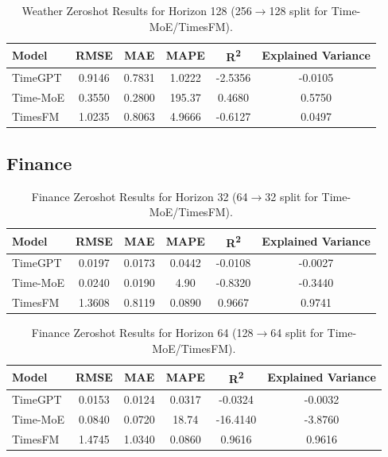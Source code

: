 \begin{table}[h!]
\centering
\begin{tabular}{lccccc}
\hline
Model      & RMSE   & MAE    & MAPE    & R\textsuperscript{2} & Explained Variance \\
\hline
TimeGPT    & 0.9146 & 0.7831 & 1.0222 & -2.5356 & -0.0105 \\
Time-MoE   & 0.3550 & 0.2800 & 195.37 & 0.4680  & 0.5750 \\
TimesFM    & 1.0235 & 0.8063 & 4.9666 & -0.6127 & 0.0497 \\
\hline
\end{tabular}
\caption{Weather Zeroshot Results for Horizon 128 (256$\to$128 split for Time-MoE/TimesFM).}
\label{tab:weather_h128}
\end{table}

\newpage
\subsection{Finance}

\begin{table}[h!]
\centering
\begin{tabular}{lccccc}
\hline
Model      & RMSE   & MAE    & MAPE    & R\textsuperscript{2} & Explained Variance \\
\hline
TimeGPT    & 0.0197 & 0.0173 & 0.0442 & -0.0108 & -0.0027 \\
Time-MoE   & 0.0240 & 0.0190 & 4.90   & -0.8320 & -0.3440 \\
TimesFM    & 1.3608 & 0.8119 & 0.0890 & 0.9667  & 0.9741 \\
\hline
\end{tabular}
\caption{Finance Zeroshot Results for Horizon 32 (64$\to$32 split for Time-MoE/TimesFM).}
\label{tab:finance_h32}
\end{table}

\begin{table}[h!]
\centering
\begin{tabular}{lccccc}
\hline
Model      & RMSE   & MAE    & MAPE    & R\textsuperscript{2} & Explained Variance \\
\hline
TimeGPT    & 0.0153 & 0.0124 & 0.0317 & -0.0324 & -0.0032 \\
Time-MoE   & 0.0840 & 0.0720 & 18.74  & -16.4140 & -3.8760 \\
TimesFM    & 1.4745 & 1.0340 & 0.0860 & 0.9616  & 0.9616 \\
\hline
\end{tabular}
\caption{Finance Zeroshot Results for Horizon 64 (128$\to$64 split for Time-MoE/TimesFM).}
\label{tab:finance_h64}
\end{table}

